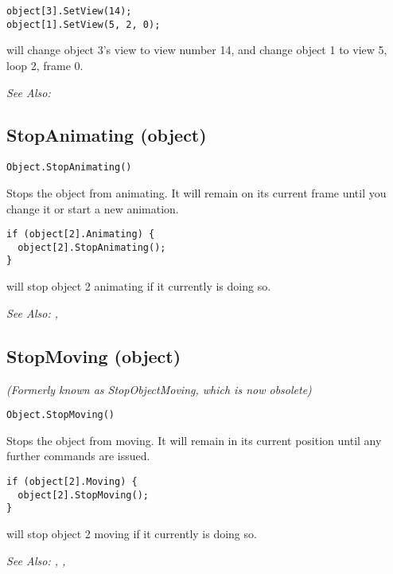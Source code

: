 \begin{verbatim}
object[3].SetView(14);
object[1].SetView(5, 2, 0);
\end{verbatim}
will change object 3's view to view number 14, and change object 1 to view 5, loop 2, frame 0.

\it{See Also:} 


\subsection{StopAnimating (object)}\label{Object.StopAnimating}%

\begin{verbatim}
Object.StopAnimating()
\end{verbatim}
Stops the object from animating. It will remain on its current frame until you change it
or start a new animation.

\begin{verbatim}
if (object[2].Animating) {
  object[2].StopAnimating();
}
\end{verbatim}
will stop object 2 animating if it currently is doing so.

\it{See Also:} ,


\subsection{StopMoving (object)}\label{Object.StopMoving}%

\it{(Formerly known as StopObjectMoving, which is now obsolete)}

\begin{verbatim}
Object.StopMoving()
\end{verbatim}
Stops the object from moving. It will remain in its current position
until any further commands are issued.

\begin{verbatim}
if (object[2].Moving) {
  object[2].StopMoving();
}
\end{verbatim}
will stop object 2 moving if it currently is doing so.

\it{See Also:} , ,


